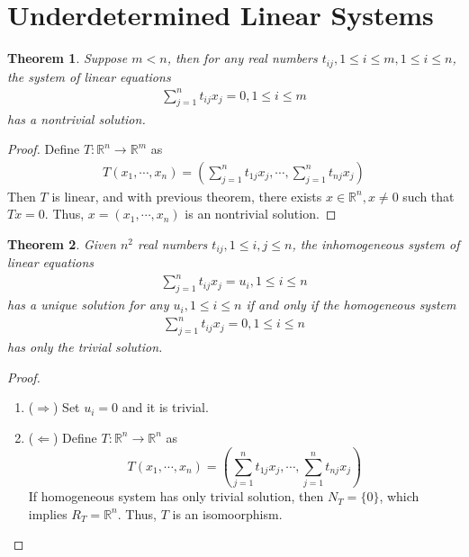 \documentclass[11pt]{book}
\newtheorem{theorem}{Theorem}[section]
\theoremstyle{definition}
\numberwithin{equation}{chapter}
\begin{document}
\medskip

\section{Underdetermined Linear Systems}
\begin{theorem}
Suppose $m < n$, then for any real numbers $t_{ij}, 1\leq i\leq m, 1\leq i\leq n$, the system of linear equations
\begin{align*}
    \sum^n_{j=1}t_{ij} x_j = 0, 1\leq i \leq m
\end{align*}
has a nontrivial solution.
\end{theorem}
\begin{proof}
Define $T:\mathbb{R}^n\to\mathbb{R}^m$ as
\begin{align*}
    T(x_1,\cdots,x_n) = \left(\sum^n_{j=1}t_{1j} x_j, \cdots, \sum^n_{j=1}t_{nj} x_j\right)
\end{align*}
Then $T$ is linear, and with previous theorem, there exists $x\in\mathbb{R}^n, x\neq 0$ such that $T x = 0$. Thus, $x = (x_1,\cdots,x_n)$ is an nontrivial solution.
\end{proof}

\medskip

\begin{theorem}
Given $n^2$ real numbers $t_{ij}, 1\leq i,j\leq n$, the inhomogeneous system of linear equations
\begin{align*}
    \sum^n_{j=1}t_{ij} x_j = u_i, 1\leq i \leq n
\end{align*}
has a unique solution for any $u_i, 1\leq i \leq n$ if and only if the homogeneous system
\begin{align*}
    \sum^n_{j=1}t_{ij} x_j = 0, 1\leq i \leq n
\end{align*}
has only the trivial solution.
\end{theorem}
\begin{proof}
~\begin{enumerate}[label=(\arabic*)]
    \item ($\Rightarrow$) Set $u_i = 0$ and it is trivial.
    \item ($\Leftarrow$) Define $T:\mathbb{R}^n\to\mathbb{R}^n$ as 
    $$T(x_1,\cdots,x_n) = \left(\sum^n_{j=1}t_{1j} x_j, \cdots, \sum^n_{j=1}t_{nj} x_j\right)$$
    If homogeneous system has only trivial solution, then $N_T = \{0\}$, which implies $R_T = \mathbb{R}^n$. Thus, $T$ is an isomoorphism. 
\end{enumerate}
\end{proof}
\end{document}
